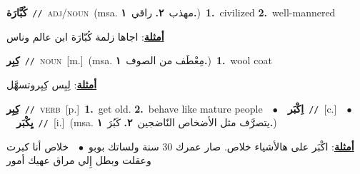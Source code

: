 \documentclass[10pt,a4paper,twoside]{article} %
\begin{document}
\begin{multicols}{2}
{\setlength\topsep{0pt}\textbf{\foreignlanguage{arabic}{كُبَّارَة}}\ {\color{gray}\texttt{//}\color{black}}\ \textsc{adj/noun}\ \color{gray}(msa. \foreignlanguage{arabic}{مهذب}~\foreignlanguage{arabic}{\textbf{٢.}}  \foreignlanguage{arabic}{راقي}~\foreignlanguage{arabic}{\textbf{١.}})\color{black}\ \textbf{1.}~civilized  \textbf{2.}~well-mannered\  \begin{flushright}\color{gray}\foreignlanguage{arabic}{\textbf{\underline{\foreignlanguage{arabic}{أمثلة}}}: اجاها زلمة كُبّارَة ابن عالم وناس}\end{flushright}\color{black}} \vspace{2mm}

{\setlength\topsep{0pt}\textbf{\foreignlanguage{arabic}{كِبِر}}\ {\color{gray}\texttt{//}\color{black}}\ \textsc{noun}\ [m.]\ \color{gray}(msa. \foreignlanguage{arabic}{مِعْطَف من الصوف}~\foreignlanguage{arabic}{\textbf{١.}})\color{black}\ \textbf{1.}~wool coat\  \begin{flushright}\color{gray}\foreignlanguage{arabic}{\textbf{\underline{\foreignlanguage{arabic}{أمثلة}}}: لِبِس كِبِروتسهَّل}\end{flushright}\color{black}} \vspace{2mm}

{\setlength\topsep{0pt}\textbf{\foreignlanguage{arabic}{كِبِر}}\ {\color{gray}\texttt{//}\color{black}}\ \textsc{verb}\ [p.]\ \textbf{1.}~get old.  \textbf{2.}~behave like mature people\ \ $\bullet$\ \ \setlength\topsep{0pt}\textbf{\foreignlanguage{arabic}{اِكْبَر}}\ {\color{gray}\texttt{//}\color{black}}\ [c.]\ \ $\bullet$\ \ \setlength\topsep{0pt}\textbf{\foreignlanguage{arabic}{يِكْبَر}}\ {\color{gray}\texttt{//}\color{black}}\ [i.]\ \color{gray}(msa. \foreignlanguage{arabic}{يتصرَّف مثل الأضخاص النّاضجين}~\foreignlanguage{arabic}{\textbf{٢.}}  \foreignlanguage{arabic}{كَبُرَ}~\foreignlanguage{arabic}{\textbf{١.}})\color{black}\  \begin{flushright}\color{gray}\foreignlanguage{arabic}{\textbf{\underline{\foreignlanguage{arabic}{أمثلة}}}: اكْبَر على هالأشياء خلاص. صار عمرك 30 سنة ولساتك بوبو\ $\bullet$\ \  خلاص أنا كبرت وعقلت وبطل إِلي مراق عهيك أمور}\end{flushright}\color{black}} \vspace{2mm}


\end{multicols}
\end{document}
